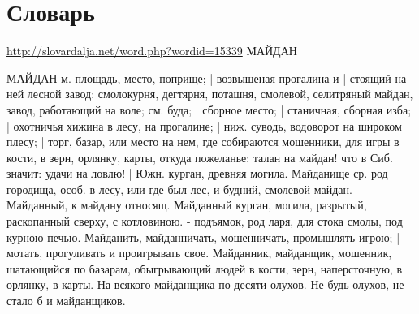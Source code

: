  
 
 
 
 
\chapter{Словарь}

\url{http://slovardalja.net/word.php?wordid=15339}
МАЙДАН

МАЙДАН м. площадь, место, поприще; | возвышеная прогалина и | стоящий на ней
лесной завод: смолокурня, дегтярня, поташня, смолевой, селитряный майдан,
завод, работающий на воле; см. буда; | сборное место; | станичная, сборная
изба; | охотничья хижина в лесу, на прогалине; | ниж. суводь, водоворот на
широком плесу; | торг, базар, или место на нем, где собираются мошенники, для
игры в кости, в зерн, орлянку, карты, откуда пожеланье: талан на майдан! что в
Сиб. значит: удачи на ловлю! | Южн. курган, древняя могила. Майданище ср. род
городища, особ. в лесу, или где был лес, и будний, смолевой майдан. Майданный,
к майдану относящ. Майданный курган, могила, разрытый, раскопанный сверху, с
котловиною. - подъямок, род ларя, для стока смолы, под курною печью. Майданить,
майданничать, мошенничать, промышлять игрою; | мотать, прогуливать и
проигрывать свое. Майданник, майданщик, мошенник, шатающийся по базарам,
обыгрывающий людей в кости, зерн, наперсточную, в орлянку, в карты. На всякого
майданщика по десяти олухов. Не будь олухов, не стало б и майданщиков.

